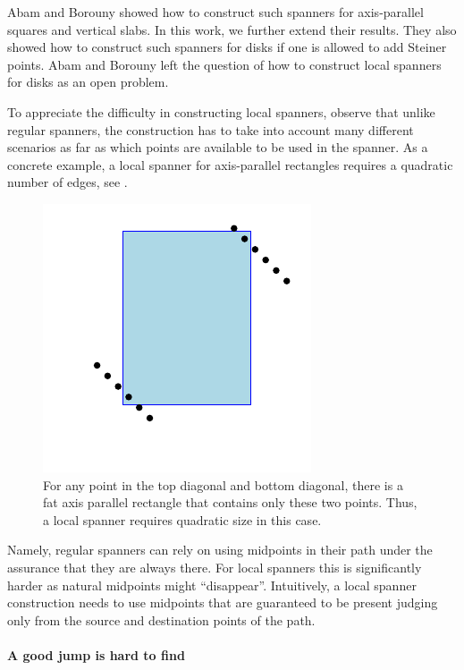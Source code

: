 Abam and Borouny \cite{ab-lgs-21} showed how to construct such
spanners for axis-parallel squares and vertical slabs. In this work,
we further extend their results.  They also showed how to
construct such spanners for disks if one is allowed to add Steiner
points. Abam and Borouny left the question of how to construct local
spanners for disks as an open problem.

To appreciate the difficulty in constructing local spanners, observe
that unlike regular spanners, the construction has to take into
account many different scenarios as far as which points are available
to be used in the spanner. As a concrete example, a local spanner for
axis-parallel rectangles requires a quadratic number of edges, see
.

\begin{figure}[h]
    \centerline{\includegraphics{figs/local_rectangles}}
    \caption{For any point in the top diagonal and bottom diagonal,
       there is a fat axis parallel rectangle that contains only these
       two points. Thus, a local spanner requires quadratic size in
       this case.  }
\end{figure}

Namely, regular spanners can rely on using midpoints in their path
under the assurance that they are always there. For local spanners
this is significantly harder as natural midpoints might
``disappear''. Intuitively, a local spanner construction needs to use
midpoints that are guaranteed to be present judging only from the
source and destination points of the path.

\paragraph*{A good jump is hard to find}

